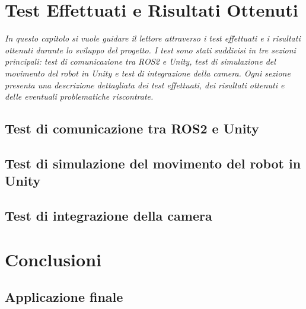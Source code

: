 \documentclass[11pt]{report}
\begin{document}
\chapter{Test Effettuati e Risultati Ottenuti}
\label{cap:Test}
\textit{In questo capitolo si vuole guidare il lettore attraverso i test effettuati e i risultati ottenuti durante lo sviluppo del progetto. I test sono stati suddivisi in tre sezioni principali: test di comunicazione tra ROS2 e Unity, test di simulazione del movimento del robot in Unity e test di integrazione della camera. Ogni sezione presenta una descrizione dettagliata dei test effettuati, dei risultati ottenuti e delle eventuali problematiche riscontrate.}

\section{Test di comunicazione tra ROS2 e Unity}
\label{sec:Test_comunicazione}

\section{Test di simulazione del movimento del robot in Unity}
\label{sec:Test_simulazione}    

\section{Test di integrazione della camera}
\label{sec:Test_camera} 


\chapter{Conclusioni}
\label{cap:Conclusioni}
\section{Applicazione finale}

\end{document}
